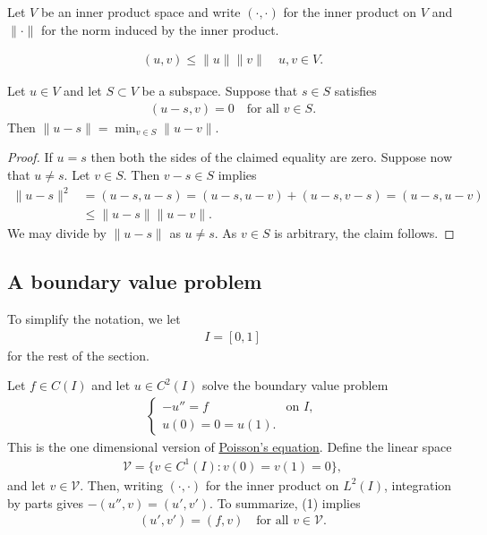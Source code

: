 \documentclass[12pt,oneside,final]{amsart}
\begin{document}
Let $V$ be an inner product space and write $(\cdot, \cdot)$ for the inner product on $V$ and $\|\cdot\|$ for the norm induced by the inner product.

\begin{lemma}
    \begin{align*}
(u, v) \le \|u\| \|v\| \quad u,v \in V.
    \end{align*}
\end{lemma}

\begin{lemma}
Let $u \in V$ and let $S \subset V$ be a subspace. Suppose that $s \in S$ satisfies
    \begin{align*}
(u - s, v) = 0 \quad \text{for all $v \in S$}.
    \end{align*}
Then $\| u - s \| = \min_{v \in S} \| u - v \|$.
\end{lemma}
\begin{proof}
If $u = s$ then both the sides of the claimed equality are zero.
Suppose now that $u \ne s$. Let $v \in S$. Then $v -s \in S$ implies
    \begin{align*}
\| u - s \|^2 
&= 
(u - s, u - s) 
= 
(u - s, u - v) + (u - s, v - s)
= 
(u - s, u - v) 
\\&\le 
\| u - s \| \| u - v \|.
    \end{align*}
We may divide by $\| u - s \|$ as $u \ne s$. As $v \in S$ is arbitrary, the claim follows.
\end{proof}

\subsection{A boundary value problem}

To simplify the notation, we let
    \begin{align*}
I = [0,1]
    \end{align*}
for the rest of the section.

Let $f \in C(I)$ and let $u \in C^2(I)$ solve the boundary value problem 
\begin{align}\label{eq_poisson_1d}
\begin{cases}
-u'' = f & \text{on $I$},
\\
u(0) = 0 = u(1).
\end{cases}\end{align}
This is the one dimensional version of \href{https://en.wikipedia.org/wiki/Poisson's_equation}{Poisson's equation}. Define the linear space
    \begin{align}\label{def_wrong_V}
\mathcal V = \{ v \in C^1(I) : v(0) = v(1) = 0 \},
    \end{align}
and let $v \in \mathcal V$. Then, writing $(\cdot, \cdot)$ for the inner product on $L^2(I)$, integration by parts gives $-(u'', v) = (u', v')$. To summarize, (1) implies
\begin{align}\label{eq_weak_prelim}
(u', v') = (f, v) \quad \text{for all $v \in \mathcal V$}. 
\end{align}
\end{document}

